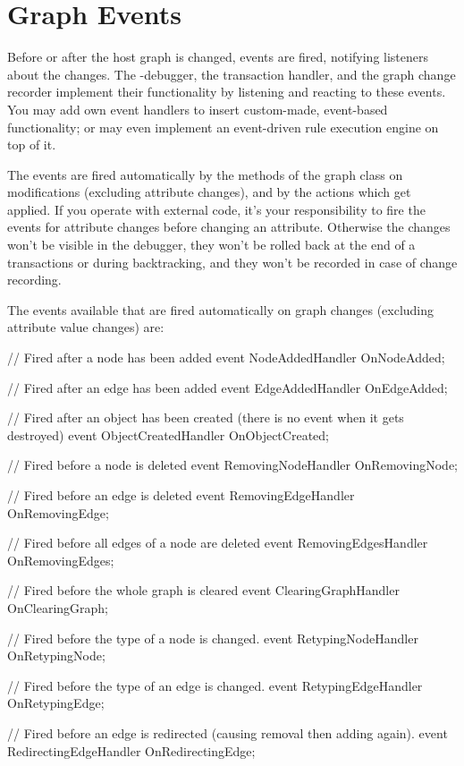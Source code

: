 \section{Graph Events}\label{sec:graphevent}

Before or after the host graph is changed, events are fired, notifying listeners about the changes.
The \GrShell-debugger, the transaction handler, and the graph change recorder implement their functionality by listening and reacting to these events.
You may add own event handlers to insert custom-made, event-based functionality;
or may even implement an event-driven rule execution engine on top of it.

The events are fired automatically by the methods of the graph class on modifications (excluding attribute changes),
and by the actions which get applied.
If you operate with external code, it's your responsibility to fire the events for attribute changes before changing an attribute.
Otherwise the changes won't be visible in the debugger, they won't be rolled back at the end of a transactions or during backtracking, and they won't be recorded in case of change recording.

The events available that are fired automatically on graph changes (excluding attribute value changes) are:

\begin{csharplet}
// Fired after a node has been added
event NodeAddedHandler OnNodeAdded;

// Fired after an edge has been added
event EdgeAddedHandler OnEdgeAdded;

// Fired after an object has been created (there is no event when it gets destroyed)
event ObjectCreatedHandler OnObjectCreated;

// Fired before a node is deleted
event RemovingNodeHandler OnRemovingNode;

// Fired before an edge is deleted
event RemovingEdgeHandler OnRemovingEdge;

// Fired before all edges of a node are deleted
event RemovingEdgesHandler OnRemovingEdges;

// Fired before the whole graph is cleared
event ClearingGraphHandler OnClearingGraph;

// Fired before the type of a node is changed.
event RetypingNodeHandler OnRetypingNode;

// Fired before the type of an edge is changed.
event RetypingEdgeHandler OnRetypingEdge;

// Fired before an edge is redirected (causing removal then adding again).
event RedirectingEdgeHandler OnRedirectingEdge;
\end{csharplet}

